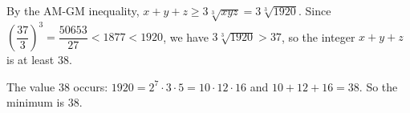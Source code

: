 By the AM-GM inequality, $x+y+z\ge3\sqrt[3]{xyz}=3\sqrt[3]{1920}$. Since $\left(\dfrac{37}{3}\right)^3=\dfrac{50653}{27}<1877<1920$, we have $3\sqrt[3]{1920}>37$, so the integer $x+y+z$ is at least $38$.

The value $38$ occurs: $1920=2^7\cdot3\cdot5=10\cdot12\cdot16$ and $10+12+16=38$. So the minimum is $\boxed{38}$.
